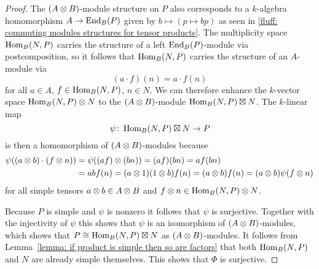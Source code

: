 \begin{proof}
  The $(A \mathbin{\otimes} B)$-module structure on $P$ also corresponds to a $k$-algebra homomorphism $A \to \operatorname{End}_B(P)$ given by $b \mapsto (p \mapsto bp)$ as seen in \ref{fluff: commuting modules structures for tensor products}. 
  The multiplicity space $\operatorname{Hom}_B(N,P)$ carries the structure of a left $\operatorname{End}_B(P)$-module via postcomposition, so it follows that $\operatorname{Hom}_B(N,P)$ carries the structure of an $A$-module via
  \[
      (a \cdot f)(n)
    = a \cdot f(n)
  \]
  for all $a \in A$, $f \in \operatorname{Hom}_B(N,P)$, $n \in N$.
  We can therefore enhance the $k$-vector space $\operatorname{Hom}_B(N,P) \mathbin{\otimes} N$ to the $(A \mathbin{\otimes} B)$-module $\operatorname{Hom}_B(N,P) \mathbin{\boxtimes} N$.
  The $k$-linear map
  \[
            \psi
    \colon  \operatorname{Hom}_B(N,P) \mathbin{\boxtimes} N
    \to     P
  \]
  is then a homomorphism of $(A \mathbin{\otimes} B)$-modules because
  \begin{align*}
        \psi((a \mathbin{\otimes} b) \cdot (f \mathbin{\otimes} n))
    &=  \psi((af) \mathbin{\otimes} (bn))
     =  (af)(bn)
     =  a f(bn) \\
    &=  a b f(n)
     =  (a \mathbin{\otimes} 1)(1 \mathbin{\otimes} b) f(n)
     =  (a \mathbin{\otimes} b) f(n)
     =  (a \mathbin{\otimes} b) \psi(f \mathbin{\otimes} n)
  \end{align*}
  for all simple tensors $a \mathbin{\otimes} b \in A \mathbin{\otimes} B$ and $f \mathbin{\otimes} n \in \operatorname{Hom}_B(N,P) \mathbin{\otimes} N$.
  
  Because $P$ is simple and $\psi$ is nonzero it follows that $\psi$ is surjective.
  Together with the injectivity of $\psi$ this shows that $\psi$ is an isomorphism of $(A \mathbin{\otimes} B)$-modules, which shows that $P \cong \operatorname{Hom}_B(N,P) \mathbin{\boxtimes} N$ as $(A \mathbin{\otimes} B)$-modules.
  It follows from Lemma~\ref{lemma: if product is simple then so are factors} that both $\operatorname{Hom}_B(N,P)$ and $N$ are already simple themselves.
  This shows that $\Phi$ is surjective.
\end{proof}




